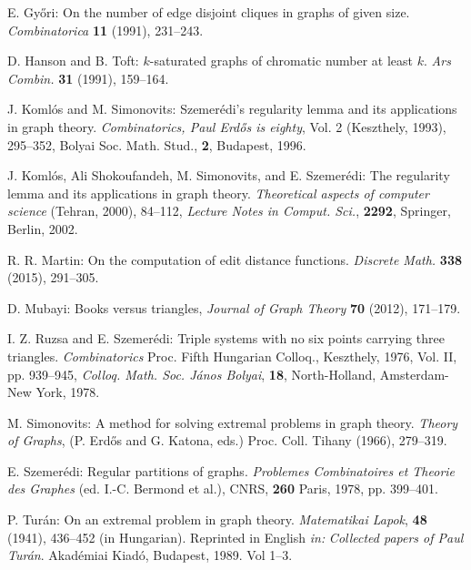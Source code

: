 \documentclass[11pt]{article}
\begin{document}
\begin{thebibliography}{10}
 E. Gy\H ori:
On the number of edge disjoint cliques in graphs of given size.
{\it Combinatorica} {\bf 11} (1991), 231--243.

 D. Hanson and B. Toft:
$k$-saturated graphs of chromatic number at least $k$.
{\it Ars Combin.} {\bf 31} (1991), 159--164.

 J. Koml\'os and M. Simonovits:
Szemer\'edi's regularity lemma and its applications in graph theory.
{\it Combinatorics, Paul Erd\H os is eighty}, Vol. 2 (Keszthely, 1993), 295--352,
Bolyai Soc. Math. Stud., {\bf 2}, Budapest, 1996.

 J. Koml\'os, Ali Shokoufandeh, M. Simonovits, and E. Szemer\'edi:
The regularity lemma and its applications in graph theory.
{\it Theoretical aspects of computer science}
(Tehran, 2000), 84--112,
{\it Lecture Notes in Comput. Sci.}, {\bf 2292}, Springer, Berlin, 2002.

 R. R. Martin:
On the computation of edit distance functions.
{\it Discrete Math.} {\bf 338} (2015), %
291--305.

 D. Mubayi:
Books versus triangles, {\it Journal of Graph Theory} {\bf 70} (2012), %
171--179.

 I. Z. Ruzsa and E. Szemer\'edi:
Triple systems with no six points carrying three triangles.
{\it Combinatorics} Proc. Fifth Hungarian Colloq., Keszthely, 1976, Vol. II, pp. 939--945,
{\it Colloq. Math. Soc. J\'anos Bolyai}, {\bf 18}, North-Holland, Amsterdam-New York, 1978.

 M. Simonovits:
A method for solving extremal problems in graph theory.
{\it Theory of Graphs}, (P. Erd\H{o}s and G. Katona, eds.)
Proc. Coll. Tihany (1966), 279--319.

 E. Szemer\'edi: Regular partitions of graphs.
{\it Problemes Combinatoires et Theorie des Graphes} (ed. I.-C. Bermond et al.),
CNRS, {\bf 260} Paris, 1978, pp. 399--401.

 P. Tur\'an:
On an extremal problem in graph theory. {\it Matematikai Lapok}, {\bf 48} (1941),
 436--452 (in Hungarian).
Reprinted in English {\it in:}
 {\it Collected papers of Paul Tur\'an}. Akad\'emiai Kiad\'o,
Budapest, 1989. Vol 1--3.



\end{thebibliography}
\end{document}
